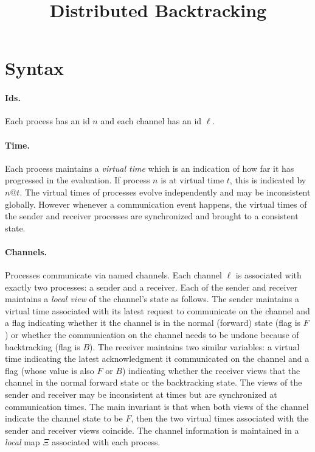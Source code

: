 \documentclass{article}
\title{Distributed Backtracking}
\author{}
\date{}
\begin{document}
\maketitle

\newcommand{\alt}{~|~}
\newcommand{\parc}[2]{#1 \,\|\, #2}
\newcommand{\send}[2]{\texttt{send}~#1~#2}
\newcommand{\stable}[1]{\texttt{stable}~#1}
\newcommand{\stableu}[1]{\underline{\texttt{stable}}~#1}
\newcommand{\backtrack}[1]{\texttt{backtrack}~#1}
\newcommand{\recv}[4]{\texttt{recv}~(#1.#2) \talloblong (#3.#4)}
\newcommand{\proc}[5]{\langle #1@#5:~ #3, #2,#4 \rangle}

\section{Syntax} 

\paragraph*{Ids.} Each process has an id $n$ and each channel has an id
$\ell$.

\paragraph*{Time.} Each process maintains a \emph{virtual time} which is an
indication of how far it has progressed in the evaluation. If process $n$ is
at virtual time $t$, this is indicated by $n@t$. The virtual times of
processes evolve independently and may be inconsistent globally. However
whenever a communication event happens, the virtual times of the sender and
receiver processes are synchronized and brought to a consistent state.

\paragraph*{Channels.} Processes communicate via named channels. Each channel
$\ell$ is associated with exactly two processes: a sender and a receiver.
Each of the sender and receiver maintains a \emph{local view} of the
channel's state as follows. The sender maintains a virtual time associated
with its latest request to communicate on the channel and a flag indicating
whether it the channel is in the normal (forward) state (flag is $F$) or
whether the communication on the channel needs to be undone because of
backtracking (flag is $B$). The receiver maintains two similar variables: a
virtual time indicating the latest acknowledgment it communicated on the
channel and a flag (whose value is also $F$ or $B$) indicating whether the
receiver views that the channel in the normal forward state or the
backtracking state. The views of the sender and receiver may be inconsistent
at times but are synchronized at communication times. The main invariant is
that when both views of the channel indicate the channel state to be $F$,
then the two virtual times associated with the sender and receiver views
coincide. The channel information is maintained in a \emph{local} map $\Xi$
associated with each process.
\end{document}
